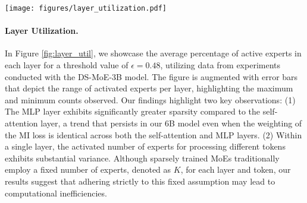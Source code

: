 \begin{figure*}
\centering
\texttt{[image: figures/layer\_utilization.pdf]}
\caption{Layer Utilization Assessment. We determine the average proportion of activated experts within both the self-attention and MLP layers. This analysis is conducted using the Wikitext dataset with our DS-MoE-3B model.}
\label{fig:layer_util}
\end{figure*}\paragraph{Layer Utilization.} In Figure \ref{fig:layer_util}, we showcase the average percentage of active experts in each layer for a threshold value of \(\epsilon=0.48\), utilizing data from experiments conducted with the DS-MoE-3B model. The figure is augmented with error bars that depict the range of activated experts per layer, highlighting the maximum and minimum counts observed. Our findings highlight two key observations: (1) The MLP layer exhibits significantly greater sparsity compared to the self-attention layer, a trend that persists in our 6B model even when the weighting of the MI loss is identical across both the self-attention and MLP layers. (2) Within a single layer, the activated number of experts for processing different tokens exhibits substantial variance. Although sparsely trained MoEs traditionally employ a fixed number of experts, denoted as \(K\), for each layer and token, our results suggest that adhering strictly to this fixed assumption may lead to computational inefficiencies.

